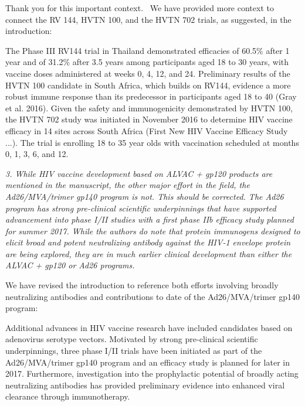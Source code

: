 \documentclass[12pt]{jpmletter}
\newenvironment{original}{\it}{}
\begin{document}
\begin{letter}{}
    Thank you for this important context.  We have provided more
    context to connect the RV 144, HVTN 100, and the HVTN 702 trials,
    as suggested, in the introduction:
    \begin{quoting}
      The Phase III RV144 trial in Thailand demonstrated efficacies of
      60.5\% after 1 year and of 31.2\% after 3.5 years among
      participants aged 18 to 30 years, with vaccine doses
      administered at weeks 0, 4, 12, and 24. Preliminary results of
      the HVTN 100 candidate in South Africa, which builds on RV144,
      evidence a more robust immune response than its predecessor in
      participants aged 18 to 40 (Gray et al. 2016). Given the safety
      and immunogenicity demonstrated by HVTN 100, the HVTN 702 study
      was initiated in November 2016 to determine HIV vaccine efficacy
      in 14 sites across South Africa (First New HIV Vaccine Efficacy
      Study ...). The trial is enrolling 18 to 35 year olds with
      vaccination scheduled at months 0, 1, 3, 6, and 12.
    \end{quoting}

    \begin{original}
      3. While HIV vaccine development based on ALVAC + gp120 products
      are mentioned in the manuscript, the other major effort in the
      field, the Ad26/MVA/trimer gp140 program is not. This should be
      corrected. The Ad26 program has strong pre-clinical scientific
      underpinnings that have supported advancement into phase I/II
      studies with a first phase IIb efficacy study planned for summer
      2017. While the authors do note that protein immunogens designed
      to elicit broad and potent neutralizing antibody against the
      HIV-1 envelope protein are being explored, they are in much
      earlier clinical development than either the ALVAC + gp120 or
      Ad26 programs.
    \end{original}
    
    We have revised the introduction to reference both efforts
    involving broadly neutralizing antibodies and contributions to
    date of the Ad26/MVA/trimer gp140 program:
    \begin{quoting}
      Additional advances in HIV vaccine research have included
      candidates based on adenovirus serotype vectors. Motivated by
      strong pre-clinical scientific underpinnings, three phase I/II
      trials have been initiated as part of the Ad26/MVA/trimer gp140
      program and an efficacy study is planned for later in
      2017. Furthermore, investigation into the prophylactic potential
      of broadly acting neutralizing antibodies has provided
      preliminary evidence into enhanced viral clearance through
      immunotherapy.
    \end{quoting}


\end{letter}
\end{document}
